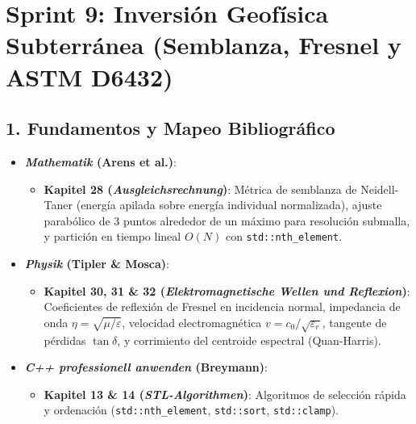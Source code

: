 \documentclass[11pt,a4paper]{article}
\begin{document}
\section{Sprint 9: Inversión Geofísica Subterránea (Semblanza, Fresnel y ASTM D6432)}

\subsection{1. Fundamentos y Mapeo Bibliográfico}
\begin{itemize}
    \item \textbf{\textit{Mathematik} (Arens et al.)}:
    \begin{itemize}
        \item \textbf{Kapitel 28 (\textit{Ausgleichsrechnung})}: Métrica de semblanza de Neidell-Taner (energía apilada sobre energía individual normalizada), ajuste parabólico de 3 puntos alrededor de un máximo para resolución submalla, y partición en tiempo lineal $O(N)$ con \texttt{std::nth\_element}.
    \end{itemize}
    \item \textbf{\textit{Physik} (Tipler \& Mosca)}:
    \begin{itemize}
        \item \textbf{Kapitel 30, 31 \& 32 (\textit{Elektromagnetische Wellen und Reflexion})}: Coeficientes de reflexión de Fresnel en incidencia normal, impedancia de onda $\eta = \sqrt{\mu / \varepsilon}$, velocidad electromagnética $v = c_0 / \sqrt{\varepsilon_r}$, tangente de pérdidas $\tan\delta$, y corrimiento del centroide espectral (Quan-Harris).
    \end{itemize}
    \item \textbf{\textit{C++ professionell anwenden} (Breymann)}:
    \begin{itemize}
        \item \textbf{Kapitel 13 \& 14 (\textit{STL-Algorithmen})}: Algoritmos de selección rápida y ordenación (\texttt{std::nth\_element}, \texttt{std::sort}, \texttt{std::clamp}).
    \end{itemize}
\end{itemize}
\end{document}
